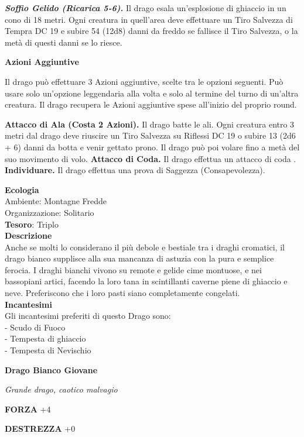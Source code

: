 \begin{multicols}{2}
	\textit{\textbf{Soffio Gelido (Ricarica 5-6).}} Il drago esala un'esplosione di ghiaccio in un cono di 18 metri. Ogni creatura in quell'area deve effettuare un Tiro Salvezza di Tempra DC 19 e subire 54 (12d8) danni da freddo se fallisce il Tiro Salvezza, o la metà di questi danni se lo riesce.

	\textbf{Azioni Aggiuntive}

	Il drago può effettuare 3 Azioni aggiuntive, scelte tra le opzioni seguenti. Può usare solo un'opzione leggendaria alla volta e solo al termine del turno di un'altra creatura. Il drago recupera le Azioni aggiuntive spese all'inizio del proprio round.

	\textbf{Attacco di Ala (Costa 2 Azioni).} Il drago batte le ali. Ogni creatura entro 3 metri dal drago deve riuscire un Tiro Salvezza su Riflessi DC 19 o subire 13 (2d6 + 6) danni da botta e venir gettato prono. Il drago può poi volare fino a metà del suo movimento di volo. \textbf{Attacco di Coda.} Il drago effettua un attacco di coda
	.
	\textbf{Individuare.} Il drago effettua una prova di Saggezza (Consapevolezza).

	\textbf{Ecologia}\\
	Ambiente: Montagne Fredde\\
	Organizzazione: Solitario\\
	\textbf{Tesoro}: Triplo\\
	\textbf{Descrizione}\\
	Anche se molti lo considerano il più debole e bestiale tra i draghi cromatici, il drago bianco supplisce alla sua mancanza di astuzia con la pura e semplice ferocia. I draghi bianchi vivono su remote e gelide cime montuose, e nei bassopiani artici, facendo la loro tana in scintillanti caverne piene di ghiaccio e neve. Preferiscono che i loro pasti siano completamente congelati.\\
	\textbf{Incantesimi}\\
	Gli incantesimi preferiti di questo Drago sono:\\
	- Scudo di Fuoco\\
	- Tempesta di ghiaccio\\
	- Tempesta di Nevischio


	\medskip{}\textbf{Drago Bianco Giovane}

	\textit{Grande drago, caotico malvagio}

	\textbf{FORZA} +4

	\textbf{DESTREZZA} +0


\end{multicols}
